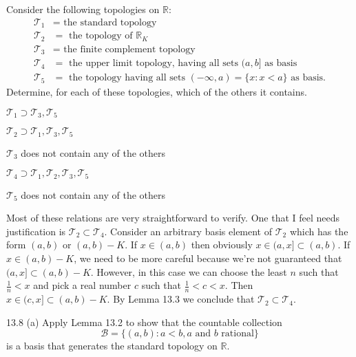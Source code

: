 \documentclass[11pt]{article}
\begin{document}
\begin{ex}{13.7}
  Consider the following topologies on $\mathbb{R}$:
  \begin{align*}
    \mathcal{T}_1 &= \text{ the standard topology } \\
    \mathcal{T}_2 &= \text{ the topology of } \mathbb{R}_K \\
    \mathcal{T}_3 &= \text{ the finite complement topology } \\
    \mathcal{T}_4 &= \text{ the upper limit topology, having all sets }
                (a, b]
                \text { as basis} \\
    \mathcal{T}_5 &= \text{ the topology having all sets }
                (-\infty, a) = \{x : x < a\}
                \text { as basis}.
  \end{align*}
  Determine, for each of these topologies, which of the others it contains.
\end{ex}

\begin{p}{1}
  $\mathcal{T}_1 \supset \mathcal{T}_3, \mathcal{T}_5$
\end{p}
\begin{p}{2}
  $\mathcal{T}_2 \supset \mathcal{T}_1, \mathcal{T}_3, \mathcal{T}_5$
\end{p}
\begin{p}{3}
  $\mathcal{T}_3$ does not contain any of the others
\end{p}
\begin{p}{4}
  $\mathcal{T}_4 \supset \mathcal{T}_1, \mathcal{T}_2, \mathcal{T}_3, \mathcal{T}_5$
\end{p}
\begin{p}{5}
  $\mathcal{T}_5$ does not contain any of the others
\end{p}

Most of these relations are very straightforward to verify. One that I feel
needs justification is $\mathcal{T}_2 \subset \mathcal{T}_4$. Consider an
arbitrary basis element of $\mathcal{T}_2$ which has the form $(a, b)$ or $(a,
b) - K$. If $x \in (a, b)$ then obviously $x \in (a, x] \subset (a, b)$. If $x
\in (a, b) - K$, we need to be more careful because we're not guaranteed that
$(a, x] \subset (a, b) - K$. However, in this case we can choose the least $n$
such that $\frac{1}{n} < x$ and pick a real number $c$ such that $\frac{1}{n} <
c < x$. Then $x \in (c, x] \subset (a, b) - K$. By Lemma 13.3 we conclude that
$\mathcal{T}_2 \subset \mathcal{T}_4$.

\begin{ex}{13.8 (a)}
  Apply Lemma 13.2 to show that the countable collection
  \[\mathcal{B} = \{(a,b) : a < b, a \text{ and } b \text{ rational}\} \]
  is a basis that generates the standard topology on $\mathbb{R}$.
\end{ex}
\end{document}
